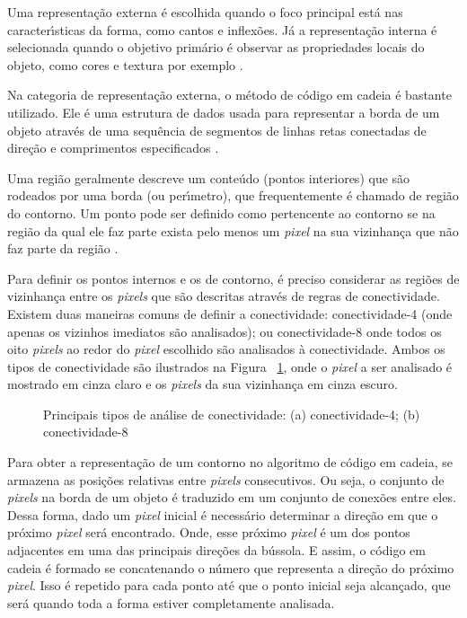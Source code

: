 Uma representa\c{c}\~{a}o externa \'{e} escolhida quando o foco principal est\'{a} nas caracter\'{\i}sticas da forma, como cantos e inflex\~{o}es. J\'{a} a 
representa\c{c}\~{a}o interna \'{e} selecionada quando o objetivo prim\'{a}rio \'{e} observar as propriedades locais do objeto, como cores e textura 
por exemplo \cite{MOESLUND:2001}.

Na categoria de representa\c{c}\~{a}o externa, o m\'{e}todo de c\'{o}digo em cadeia \'{e} bastante utilizado. Ele \'{e} uma estrutura de dados usada para 
representar a borda de um objeto atrav\'{e}s de uma sequ\^{e}ncia de segmentos de linhas retas conectadas de dire\c{c}\~{a}o e comprimentos 
especificados \cite{JAHNE:2005}\cite{GONZALEZ:2008}.

Uma regi\~{a}o geralmente descreve um conte\'{u}do (pontos interiores) que s\~{a}o rodeados por uma borda (ou per\'{\i}metro), que frequentemente \'{e} 
chamado de regi\~{a}o do contorno. Um ponto pode ser definido como pertencente ao contorno se na regi\~{a}o da qual ele faz parte exista 
pelo menos um \emph{pixel} na sua vizinhan\c{c}a que n\~{a}o faz parte da regi\~{a}o \cite{NIXON:2002}.

Para definir os pontos internos e os de contorno, \'{e} preciso considerar as regi\~{o}es de vizinhan\c{c}a entre os \emph{pixels} que s\~{a}o 
descritas atrav\'{e}s de regras de conectividade. Existem duas maneiras comuns de definir a conectividade: conectividade-4 (onde 
apenas os vizinhos imediatos s\~{a}o analisados); ou conectividade-8 onde todos os oito \emph{pixels} ao redor do \emph{pixel} 
escolhido s\~{a}o analisados \`{a} conectividade. Ambos os tipos de conectividade s\~{a}o ilustrados na Figura ~\ref{FIG:CONECT}, onde o 
\emph{pixel} a ser analisado \'{e} mostrado em cinza claro e os \emph{pixels} da sua vizinhan\c{c}a em cinza escuro.

\begin{figure}[h]
\centering
{}
\caption[Principais tipos de an\'{a}lise de conectividade]{Principais tipos de an\'{a}lise de conectividade: (a) conectividade-4; (b) 
conectividade-8} \label{FIG:CONECT}
\end{figure}


Para obter a representa\c{c}\~{a}o de um contorno no algoritmo de c\'{o}digo em cadeia, se armazena as posi\c{c}\~{o}es relativas entre \emph{pixels} 
consecutivos. Ou seja, o conjunto de \emph{pixels} na borda de um objeto \'{e} traduzido em um conjunto de conex\~{o}es entre eles. Dessa 
forma, dado um \emph{pixel} inicial \'{e} necess\'{a}rio determinar a dire\c{c}\~{a}o em que o pr\'{o}ximo \emph{pixel} ser\'{a} encontrado. Onde, esse 
pr\'{o}ximo \emph{pixel} \'{e} um dos pontos adjacentes em uma das principais dire\c{c}\~{o}es da b\'{u}ssola. E assim, o c\'{o}digo em cadeia \'{e} formado 
se concatenando o n\'{u}mero que representa a dire\c{c}\~{a}o do pr\'{o}ximo \emph{pixel}. Isso \'{e} repetido para cada ponto at\'{e} que o ponto inicial 
seja alcan\c{c}ado, que ser\'{a} quando toda a forma estiver completamente analisada.

